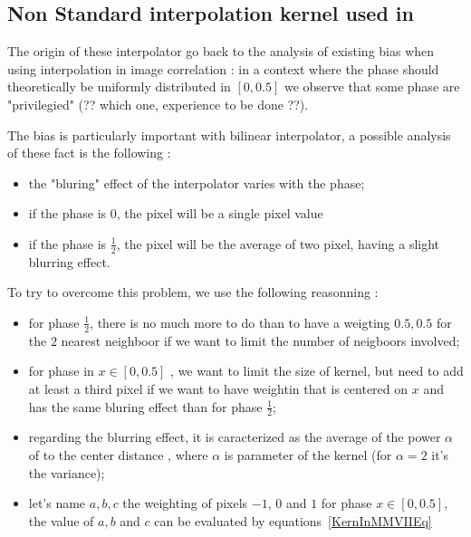 \subsection{Non Standard interpolation kernel used in \PPP}

\label{MMVIIInterpol}

The origin of these interpolator go back to the analysis of existing bias when using interpolation
in image correlation : in a context where the phase should theoretically be uniformly 
distributed in $[0,0.5]$ we  observe that some phase are "privilegied"  (?? which one, experience to be done ??).

The bias is particularly important with bilinear interpolator, a possible
analysis of these fact is the following :

\begin{itemize}
    \item  the "bluring" effect of the interpolator varies with the phase;
    \item  if the phase is $0$, the pixel will be a single pixel value 
    \item  if the phase is $\frac{1}{2}$, the pixel will be the average of two
           pixel, having a slight blurring effect.
\end{itemize}

To try to overcome this problem, we use the following reasonning :

\begin{itemize}
    \item  for phase  $\frac{1}{2}$, there is no much more to do than to have
           a weigting $0.5,0.5$ for the $2$ nearest neighboor if we want to limit the number of neigboors
           involved;
    \item  for phase  in $x \in [0,0.5]$ , we want to limit the size of kernel,
           but need to add at least a third pixel if we want to have weightin
           that is centered on $x$ and has the same bluring effect than for phase $\frac{1}{2}$;
    \item  regarding the blurring effect, it is caracterized as the average of the power $\alpha$ of 
           to the center distance , where $\alpha$ is parameter of the kernel (for $\alpha=2$ it's the
           variance);
     \item let's name $a,b,c$ the weighting of pixels $-1$, $0$ and $1$ for phase $x \in [0,0.5]$, the value
           of $a,b$ and $c$ can be evaluated by equations~\ref{KernInMMVIIEq}
\end{itemize}

